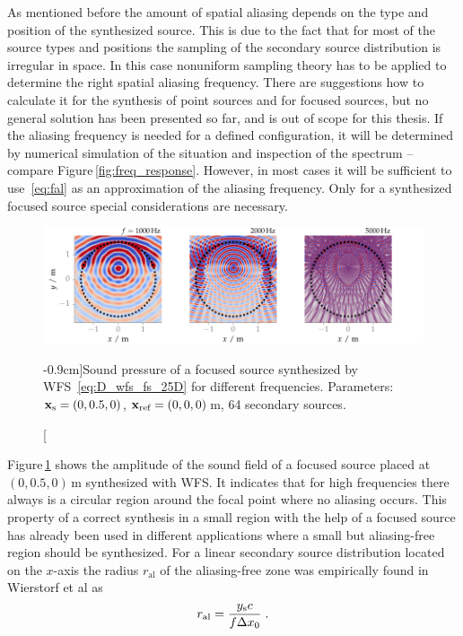 As mentioned before the amount of spatial aliasing depends on the type
and position of the synthesized source. This is due to the fact that for most
of the source types and positions the sampling of the
secondary source distribution is irregular in space. In this case
nonuniform sampling theory has to be applied to determine the right spatial aliasing
frequency. There are suggestions how to calculate it for the synthesis of point
sources\autocite{Corteel2006} and for focused sources\autocite{Oldfield2013},
but no general solution has been presented so far, and is out of scope for
this thesis.
If the aliasing frequency is needed for a
defined configuration, it will be
determined by numerical simulation of the situation and inspection of the
spectrum -- compare Figure\,\ref{fig:freq_response}.
However, in most cases it will be sufficient to use~\eqref{eq:fal} as an approximation of
the aliasing frequency. Only for a synthesized focused source special
considerations are necessary.

%
\begin{figure}[b]
    \includegraphics{fig3_09/fig3_09}
    \caption[][-0.9cm]{Sound pressure of a focused source
    synthesized by
    \ac{WFS}~\protect\eqref{eq:D_wfs_fs_25D} for different frequencies. Parameters:
    $\mathbf{x}_\text{s} = (0,0.5,0)$, $\mathbf{x}_\text{ref} = (0,0,0)$\,m, 64 secondary sources.
    }
    \label{fig:aliasing_fs}
\end{figure}
%
Figure\,\ref{fig:aliasing_fs} shows the
amplitude of the sound field of a focused source placed at $(0,0.5,0)$\,m
synthesized with \twohalfD \ac{WFS}. It indicates that for high frequencies
there always is a circular region around the focal point where no aliasing
occurs. This property of a correct synthesis in a small region with the help of
a focused source has already been used in different applications where a
small but aliasing-free region should be
synthesized.\autocite[E.g.][]{Spors2010b}
For a linear secondary source distribution located on the $x$-axis
the radius $r_\text{al}$ of the aliasing-free zone was empirically found
in Wierstorf et al\autocite[][(12)]{Wierstorf2013b} as
%
\begin{equation}
    r_\text{al} = \frac{y_\text{s}c}{f\Delta x_0} \;.
\end{equation}

